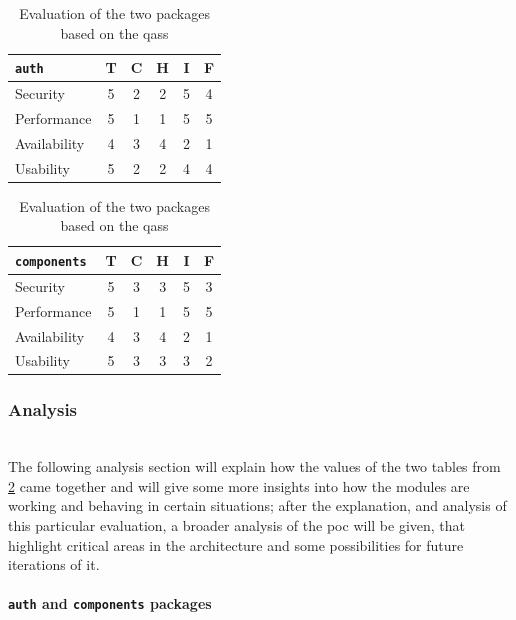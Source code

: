 \begin{table}[h!]
    \centering
    \begin{tabular}{| l | c | c | c | c | c |} 
     \hline
     \texttt{auth} & T & C & H & I & F \\
     \hline
     Security & 5 & 2 & 2 & 5 & \cellcolor{red!25}4\\
     \hline
     Performance & 5 & 1 & 1 & 5 & \cellcolor{red!50}5\\
     \hline
     Availability & 4 & 3 & 4 & 2 & \cellcolor{green!25}1\\
     \hline
     Usability & 5 & 2 & 2 & 4 & \cellcolor{red!25}4\\
     \hline
    \end{tabular}
    \quad
    \begin{tabular}{| l | c | c | c | c | c |} 
     \hline
     \texttt{components} & T & C & H & I & F \\
     \hline
     Security & 5 & 3 & 3 & 5 & \cellcolor{orange!50}3\\
     \hline
     Performance & 5 & 1 & 1 & 5 & \cellcolor{red!50}5\\
     \hline
     Availability & 4 & 3 & 4 & 2 & \cellcolor{green!25}1\\
     \hline
     Usability & 5 & 3 & 3 & 3 & \cellcolor{green!25}2\\
     \hline
    \end{tabular}
    \vspace{0.75cm}
    \caption{Evaluation of the two packages based on the \glspl{qas}}
    \label{table:poc1-evaluation}
\end{table}

\subsubsection{Analysis}\mbox{}\\

The following analysis section will explain how the values of the two tables from \ref{table:poc1-evaluation} came together and will give some more insights into how the modules are working and behaving in certain situations; after the explanation, and analysis of this particular evaluation, a broader analysis of the \gls{poc} will be given, that highlight critical areas in the architecture and some possibilities for future iterations of it.
\vspace{0.5cm}
\paragraph{\texttt{auth} and \texttt{components} packages}\mbox{}\\

